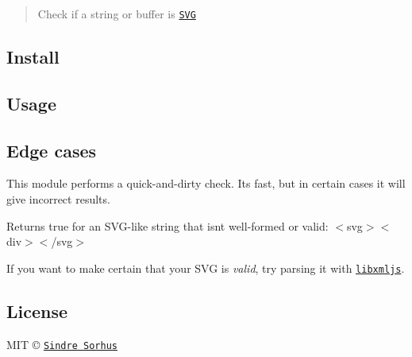 \begin{quote}
Check if a string or buffer is \href{http://en.wikipedia.org/wiki/Scalable_Vector_Graphics}{\tt S\+VG} \end{quote}


\subsection*{Install}




\subsection*{Usage}




\subsection*{Edge cases}

This module performs a quick-\/and-\/dirty check. It\textquotesingle{}s fast, but in certain cases it will give incorrect results.


\begin{DoxyItemize}
\item Returns {\ttfamily true} for an S\+V\+G-\/like string that isn\textquotesingle{}t well-\/formed or valid\+: {\ttfamily $<$svg$>$$<$div$>$$<$/svg$>$}
\end{DoxyItemize}

If you want to make certain that your S\+VG is {\itshape valid}, try parsing it with \href{https://github.com/polotek/libxmljs}{\tt libxmljs}.

\subsection*{License}

M\+IT © \href{https://sindresorhus.com}{\tt Sindre Sorhus} 